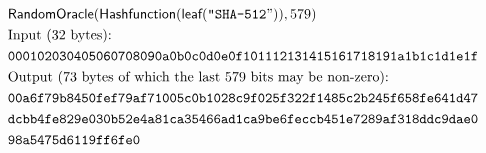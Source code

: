 \begin{align*}
&\textsf{RandomOracle}(\textsf{Hashfunction}(\textsf{leaf}(\texttt{"SHA-512}")),579)\\
&\textrm{Input (32 bytes):}\\
&\texttt{000102030405060708090a0b0c0d0e0f101112131415161718191a1b1c1d1e1f}\\
&\textrm{Output (73 bytes of which the last 579 bits may be non-zero):}\\
&\texttt{00a6f79b8450fef79af71005c0b1028c9f025f322f1485c2b245f658fe641d47}\\
&\texttt{dcbb4fe829e030b52e4a81ca35466ad1ca9be6feccb451e7289af318ddc9dae0}\\
&\texttt{98a5475d6119ff6fe0}
\end{align*}
